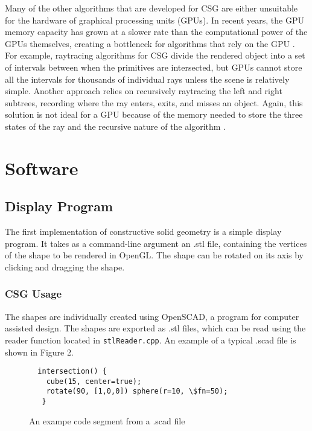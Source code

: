 \documentclass[12pt]{article}
\begin{document}
\begin{doublespace}
Many of the other algorithms that are developed for CSG are either unsuitable for the hardware of graphical processing units (GPUs). In recent years, the GPU memory capacity has grown at a slower rate than the computational power of the GPUs themselves, creating a bottleneck for algorithms that rely on the GPU \cite{interactive_csg}. For example, raytracing algorithms for CSG divide the rendered object into a set of intervals between when the primitives are intersected, but GPUs cannot store all the intervals for thousands of individual rays unless the scene is relatively simple. Another approach relies on recursively raytracing the left and right subtrees, recording where the ray enters, exits, and misses an object. Again, this solution is not ideal for a GPU because of the memory needed to store the three states of the ray and the recursive nature of the algorithm \cite{interactive_csg}.
\section{Software}
\subsection{Display Program}
The first implementation of constructive solid geometry is a simple display program. It takes as a command-line argument an .stl file, containing the vertices of the shape to be rendered in OpenGL. The shape can be rotated on its axis by clicking and dragging the shape.
\subsubsection{CSG Usage}
The shapes are individually created using OpenSCAD, a program for computer assisted design. The shapes are exported as .stl files, which can be read using the reader function located in \texttt{stlReader.cpp}. An example of a typical .scad file is shown in Figure 2.\\
\lstset{language=scad}
\begin{figure}[h]
\begin{lstlisting}
  intersection() {
    cube(15, center=true);
    rotate(90, [1,0,0]) sphere(r=10, \$fn=50);
   }
\end{lstlisting}
\centering
\caption{An exampe code segment from a .scad file}
\end{figure}


\end{doublespace}
\end{document}
